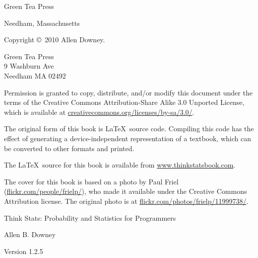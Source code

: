\documentclass[12pt]{book}
\newcommand{\thetitle}{Think Stats: Probability and Statistics for Programmers}
\newcommand{\theversion}{1.2.5}
\begin{document}
\begin{latexonly}
\begin{flushright}
\vspace{0.5in}

{\Large Green Tea Press}

{\small Needham, Massachusetts}

\vfill

\end{flushright}


\pagebreak
\thispagestyle{empty}

{\small
Copyright \copyright ~2010 Allen Downey.


\vspace{0.2in}

\begin{flushleft}
Green Tea Press       \\
9 Washburn Ave \\
Needham MA 02492
\end{flushleft}

Permission is granted to copy, distribute, and/or modify this document
under the terms of the Creative Commons Attribution-Share Alike 3.0 Unported
License, which is available at \url{creativecommons.org/licenses/by-sa/3.0/}.

The original form of this book is \LaTeX\ source code.  Compiling this
code has the effect of generating a device-independent representation
of a textbook, which can be converted to other formats and printed.

The \LaTeX\ source for this book is available from
\url{www.thinkstatsbook.com}.

The cover for this book is based on a photo by Paul Friel
(\url{flickr.com/people/frielp/}), who made it available under
the Creative Commons Attribution license.  The original photo
is at \url{flickr.com/photos/frielp/11999738/}.

\vspace{0.2in}

} %

\end{latexonly}



\begin{htmlonly}


{\Large \thetitle}

{\large Allen B. Downey}

Version \theversion

\setcounter{chapter}{-1}

\end{htmlonly}
\end{document}
